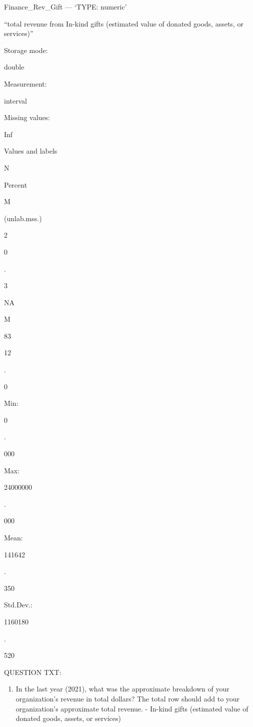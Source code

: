 \documentclass[
  letterpaper,
]{scrbook}
\providecommand{\tightlist}{%
  \setlength{\itemsep}{0pt}\setlength{\parskip}{0pt}}\usepackage{longtable,booktabs,array}
\begin{document}
\begin{enumerate}
\begin{enumerate}
\begin{enumerate}
\begin{enumerate}
        Finance\_Rev\_Gift --- {`TYPE: numeric'}

        ``total revenue from In-kind gifts (estimated value of donated
        goods, assets, or services)''

        Storage mode:

        double

        Measurement:

        interval

        Missing values:

        Inf

        Values and labels

        N

        Percent

        M

        (unlab.mss.)

        2

        0

        .

        3

        NA

        M

        83

        12

        .

        0

        Min:

        0

        .

        000

        Max:

        24000000

        .

        000

        Mean:

        141642

        .

        350

        Std.Dev.:

        1160180

        .

        520

        QUESTION TXT:

        \begin{enumerate}
        \def\labelenumv{\arabic{enumv}.}
        \tightlist
        \item
          In the last year (2021), what was the approximate breakdown of
          your organization's revenue in total dollars? The total row
          should add to your organization's approximate total revenue. -
          In-kind gifts (estimated value of donated goods, assets, or
          services)


\end{enumerate}
\end{enumerate}
\end{enumerate}
\end{enumerate}
\end{enumerate}
\end{document}
